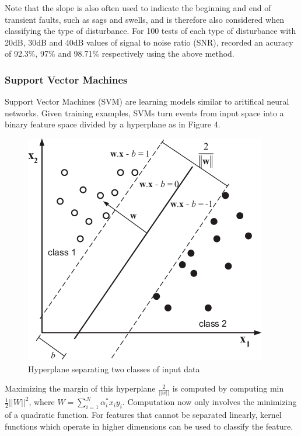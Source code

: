 \documentclass[12pt]{article}
\begin{document}
{Note that the slope is also often used to indicate the beginning and end of transient faults, such as sags and swells, and is therefore also considered when classifying the type of disturbance. For 100 tests of each type of disturbance with 20dB, 30dB and 40dB values of signal to noise ratio (SNR), \cite{KF} recorded an acuracy of 92.3\%, 97\% and 98.71\% respectively using the above method. 
\newpage
\subsubsection{Support Vector Machines}
Support Vector Machines (SVM) are learning models similar to aritifical neural networks. Given training examples, SVMs turn events from input space into a binary feature space divided by a hyperplane as in Figure 4. 

\begin{figure}[H]
\centering
\includegraphics[scale=0.5]{SVM-separating-hyperplane}
\caption{Hyperplane separating two classes of input data \cite{SVMdiag}}
\end{figure}
Maximizing the margin of this hyperplane $\frac{2}{||w||}$ is computed by computing min$\frac{1}{2}||W||^2$, where $W = \sum_{i=1}^N \alpha_i^{*}x_iy_i$. Computation now only involves the minimizing of a quadratic function. For features that cannot be separated linearly, kernel functions which operate in higher dimensions can be used to classify the feature. 

}
\end{document}

